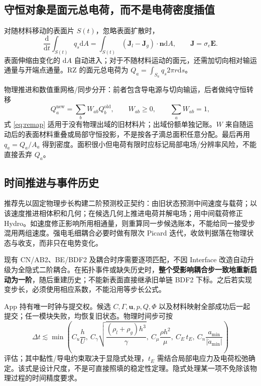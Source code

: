 \documentclass[11pt,a4paper]{article}
\newcommand{\dd}{\mathrm{d}}
\newcommand{\vct}[1]{\boldsymbol{#1}}
\begin{document}
\subsection{守恒对象是面元总电荷，而不是电荷密度插值}
对随材料移动的表面片 $S(t)$，忽略表面扩散时，
\begin{equation}
 \frac{\dd}{\dd t}\int_{S(t)}q_s\dd A
       =\int_{S(t)}(\vct J_l-\vct J_g)\cdot\vct n\dd A,
 \qquad\vct J=\sigma_e\vct E.\label{eq:charge}
\end{equation}
表面伸缩由变化的 $\dd A$ 自动进入；对于不随材料运动的面元，还需加切向相对输运通量与开端点通量。RZ 的面元总电荷为 $Q_a=\int_{S_a}q_s2\pi r\dd s$。

物理推进和数值重网格/同步分开：前者包含导电源与切向输运，后者做纯守恒转移
\begin{equation}
 Q_a^{\mathrm{new}}=\sum_b W_{ab}Q_b^{\mathrm{old}},\qquad
 W_{ab}\ge0,\qquad\sum_aW_{ab}=1,\label{eq:remap}
\end{equation}
式 \eqref{eq:remap} 适用于没有物理出域的旧材料片；出域份额单独记账。$W$ 来自随运动后的表面材料重叠或局部守恒投影，不是按各子滴总面积任意分配。最后再用 $q_a=Q_a/A_a$ 得到密度。面积很小但电荷有限时应标记局部电场/分辨率风险，不能直接丢弃 $Q_a$。

\subsection{时间推进与事件历史}
推荐先以固定物理步长构建二阶预测校正契约：由旧状态预测中间速度与载荷；以该速度推进相体积和几何；在候选几何上推进电荷并解电场；用中间载荷修正 Hydro。如速度修正影响所用相通量，则重算同一步候选账本，不能给同一接受步混用两组速度。强电毛细耦合必要时做有限次 Picard 迭代，收敛判据落在物理状态与收支，而非只在电势变化。

现有 CN/AB2、BE/BDF2 及耦合时序需要逐项匹配，不因 Interface 改造自动升级为全隐式二阶耦合。在拓扑事件或缺失历史时，\textbf{整个受影响耦合步一致地重新启动为一阶}，随后重建历史；不能新表面直接继承旧单链 BDF2 下标。之后若实现变步长，必须使用相应系数，不能沿用等步长公式。

App 持有唯一时钟与提交权。候选 $C,\Gamma,\vct u,p,Q,\Phi$ 以及材料映射全部成功后一起提交；任一模块失败，均恢复旧状态。物理时间步可按
\begin{equation}
 \Delta t\lesssim\min\left(C_u\frac{h}{U},\
 C_\gamma\sqrt{\frac{(\rho_l+\rho_g)h^3}{\gamma}},\
 C_\mu\frac{\rho h^2}{\mu},\ C_E\,t_E,\ C_n\frac{a_{\min}}{|\dot a_{\min}|}\right)
\end{equation}
评估；其中黏性/导电约束取决于显隐式处理，$t_E$ 需结合局部电应力及电荷松弛确定。该式是设计尺度，不是可直接照填的稳定性定理。隐式处理某一项不免除该物理过程的时间精度要求。
\end{document}
